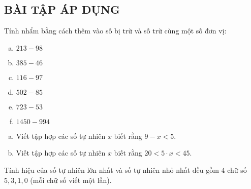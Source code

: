 \subsection{BÀI TẬP ÁP DỤNG}
\begin{bt}
Tính nhẩm bằng cách thêm vào số bị trừ và số trừ cùng một số đơn vị:
\begin{multicols}{3}
\begin{enumerate}[a)] 
\item $213-98$              	
\item $385-46$ 	
\item $116-97$ 
\item $502 - 85$
\item $723 - 53$
\item $1450 - 994$
\end{enumerate}
\end{multicols}
\end{bt}   \begin{bt}
\begin{enumerate}[a)]
\item Viết tập hợp các số tự nhiên $x$ biết rằng $9 - x<5$. 
\item Viết tập hợp các số tự nhiên $x$ biết rằng $20<5\cdot x<45$. 
\end{enumerate}
\end{bt}   \begin{bt}
Tính hiệu của số tự nhiên lớn nhất và số tự nhiên nhỏ nhất đều gồm $4$ chữ số $5, 3, 1, 0$ (mỗi chữ số viết một lần).

\end{bt}
